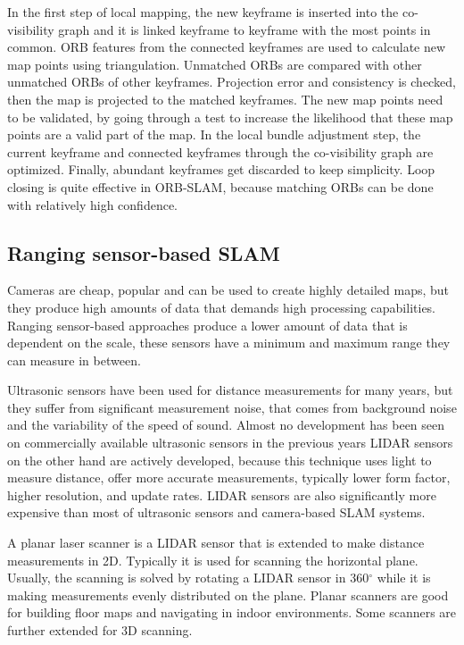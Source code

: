 In the first step of local mapping, the new keyframe is inserted into the co-visibility graph and it is linked keyframe to keyframe
with the most points in common. ORB features from the connected keyframes are used to calculate new map points using triangulation. 
Unmatched ORBs are compared with other unmatched ORBs of other keyframes. Projection error and consistency is checked, then the 
map is projected to the matched keyframes. The new map points need to be validated, by going through a test to increase the 
likelihood that these map points are a valid part of the map. In the local bundle adjustment step, the current keyframe and connected
keyframes through the co-visibility graph are optimized. Finally, abundant keyframes get discarded to keep simplicity.
Loop closing is quite effective in ORB-SLAM, because matching ORBs can be done with relatively high confidence.

\subsection{Ranging sensor-based SLAM}
Cameras are cheap, popular and can be used to create highly detailed maps, but they produce high amounts of data that demands 
high processing capabilities. Ranging sensor-based approaches produce a lower amount of data that is dependent on the scale, these 
sensors have a minimum and maximum range they can measure in between.

Ultrasonic sensors have been used for distance measurements for many years, but they suffer from significant
measurement noise, that comes from background noise and the variability of the speed of sound. Almost no development has been seen on
commercially available ultrasonic sensors in the previous years LIDAR sensors on the other hand are actively developed, because this technique
uses light to measure distance, offer more accurate measurements, typically lower form factor, higher resolution, and update rates. 
LIDAR sensors are also significantly more expensive than most of ultrasonic sensors and camera-based SLAM systems.

A planar laser scanner is a LIDAR sensor that is extended to make distance measurements in 2D. Typically it is used for 
scanning the horizontal plane. Usually, the scanning is solved by rotating a LIDAR sensor in 360$^\circ$ while it is 
making measurements evenly distributed on the plane. Planar scanners are good for building floor maps and navigating in indoor 
environments. Some scanners are further extended for 3D scanning.


